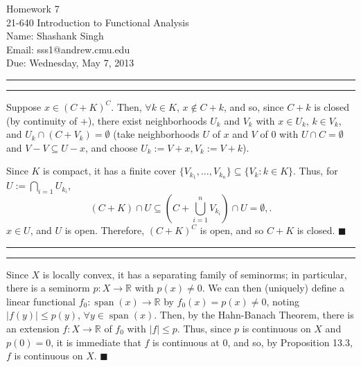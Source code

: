 \documentclass[11pt]{article}
\makeatletter
\newcounter{questionCounter}
\newcounter{partCounter}[questionCounter]
\newenvironment{question}[2][\arabic{questionCounter}]{%
    \setcounter{partCounter}{0}%
    \vspace{.25in} \hrule \vspace{0.5em}%
        \noindent{\bf #2}%
    \vspace{0.8em} \hrule \vspace{.10in}%
    \addtocounter{questionCounter}{1}%
}{}
\newcommand{\myname}{Shashank Singh}
\newcommand{\myandrew}{sss1@andrew.cmu.edu}
\newcommand{\myclass}{21-640 Introduction to Functional Analysis}
\newcommand{\myhwnum}{7}
\newcommand{\duedate}{Wednesday, May 7, 2013}
\renewcommand{\qed}{\quad $\blacksquare$}
\newcommand{\vspan}{\operatorname{span}}
\newcommand{\R}{\mathbb{R}} %
\makeatother
\begin{document}
\thispagestyle{plain}

{\Large Homework \myhwnum} \\
\myclass \\
Name: \myname \\
Email: \myandrew \\
Due: \duedate

\begin{question}{Problem 1}
Suppose $x \in (C + K)^C$. Then, $\forall k \in K$, $x \notin C + k$, and so,
since $C + k$ is closed (by continuity of $+$), there exist neighborhoods
$U_k$ and $V_k$ with $x \in U_k$, $k \in V_k$, and
$U_k \cap (C + V_k) = \emptyset$ (take neighborhoods $U$ of $x$ and $V$ of $0$
with $U \cap C = \emptyset$ and $V - V \subseteq U - x$, and choose
$U_k := V + x, V_k := V + k$).

Since $K$ is compact, it has a finite cover
$\{V_{k_1},\dots,V_{k_n}\} \subseteq \{V_k : k \in K\}$.
Thus, for $U := \bigcap_{i = 1} U_{k_i}$,
\[(C + K) \cap U
    \subseteq \left( C + \bigcup_{i = 1}^n V_{k_i} \right) \cap U
    = \emptyset,
.\]
$x \in U$, and $U$ is open.
Therefore, $(C + K)^C$ is open, and so $C + K$ is closed. \qed
\end{question}

\begin{question}{Problem 2}
Since $X$ is locally convex, it has a separating family of seminorms; in
particular, there is a seminorm $p : X \to \R$ with $p(x) \neq 0$. We can then
(uniquely) define a linear functional $f_0 : \vspan(x) \to \R$ by
$f_0(x) = p(x) \neq 0$, noting $|f(y)| \leq p(y)$, $\forall y \in \vspan(x)$.
Then, by the Hahn-Banach Theorem, there is an extension $f : X \to \R$ of $f_0$
with $|f| \leq p$. Thus, since $p$ is continuous on $X$ and $p(0) = 0$, it is
immediate that $f$ is continuous at $0$, and so, by Proposition 13.3, $f$ is
continuous on $X$. \qed
\end{question}
\end{document}
